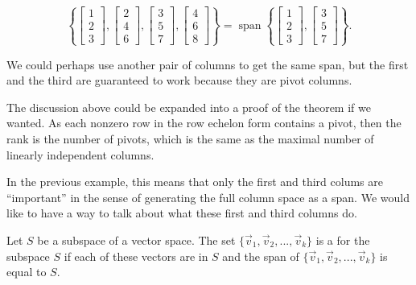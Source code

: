 \begin{exampleSol}
\begin{equation*}
\left\{
\begin{bmatrix}
1 \\
2 \\
3 
\end{bmatrix}
,
\begin{bmatrix}
2 \\
4 \\
6
\end{bmatrix}
,
\begin{bmatrix}
3 \\
5 \\
7
\end{bmatrix}
,
\begin{bmatrix}
4 \\
6 \\
8
\end{bmatrix}
\right\}
=
\operatorname{span}
\left\{
\begin{bmatrix}
1 \\
2 \\
3
\end{bmatrix}
,
\begin{bmatrix}
3 \\
5 \\
7
\end{bmatrix}
\right\} .
\end{equation*}
\end{exampleSol}
We could perhaps use another pair of columns to get the same span, but the
first and the third are guaranteed to work because they are pivot columns. 


The discussion above could be expanded into a proof of the theorem if
we wanted.
As each nonzero row
in the row echelon form contains a pivot, then the rank is the number of
pivots, which is the same as the maximal number of linearly independent
columns. 

In the previous example, this means that only the first and third colums are ``important'' in the sense of generating the full column space as a span. We would like to have a way to talk about what these first and third columns do.

\begin{definition}
Let $S$ be a subspace of a vector space. The set $\{\vec{v}_1, \vec{v}_2, ..., \vec{v}_k\}$ is a \emph{} for the subspace $S$ if each of these vectors are in $S$ and the span of $\{\vec{v}_1, \vec{v}_2, ..., \vec{v}_k\}$ is equal to $S$. 
\end{definition}


